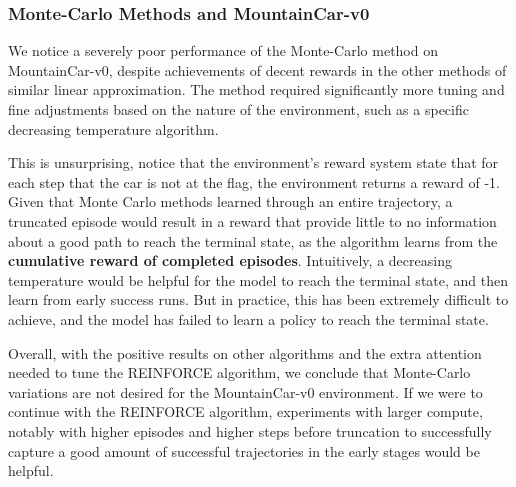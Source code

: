 \documentclass{article}
\begin{document}
\subsubsection{Monte-Carlo Methods and MountainCar-v0}
We notice a severely poor performance of the Monte-Carlo method on MountainCar-v0,
despite achievements of decent rewards in the other methods of similar linear approximation. The method required
significantly more tuning and fine adjustments based on the nature of the environment,
such as a specific decreasing temperature algorithm.

This is unsurprising, notice that the environment's reward system state that
for each step that the car is not at the flag, the environment returns a reward of -1.
Given that Monte Carlo methods learned through an entire trajectory, a truncated
episode would result in a reward that provide little to no information about a good path to
reach the terminal state, as the algorithm learns from the \textbf{cumulative reward of completed episodes}.
Intuitively, a decreasing temperature would be helpful for the model to reach the terminal state, and then learn from early success runs.
But in practice, this has been extremely difficult to achieve, and the model has failed to learn
a policy to reach the terminal state.

Overall, with the positive results on other algorithms and the extra attention needed to tune the
REINFORCE algorithm, we conclude that Monte-Carlo variations are not desired for the MountainCar-v0 environment.
If we were to continue with the REINFORCE algorithm, experiments with larger
compute, notably with higher episodes and higher steps before truncation to successfully capture
a good amount of successful trajectories in the early stages would be helpful.

\newpage


\end{document}
